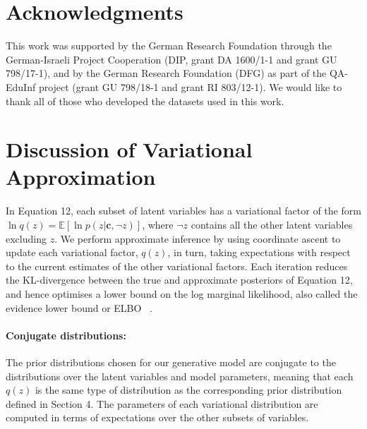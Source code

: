 \documentclass[11pt,a4paper]{article}
\newcommand{\bs}{\boldsymbol}
\begin{document}
\section*{Acknowledgments}

This work was supported by the German Research Foundation through the German-Israeli Project Cooperation (DIP, grant DA 1600/1-1 and grant GU 798/17-1), and 
by the German Research Foundation (DFG) as part of the QA-EduInf project (grant GU 798/18-1 and grant RI 803/12-1). 
We would like to thank all of those who developed the datasets used
in this work.

%
% 



\appendix
\section{Discussion of Variational Approximation}

In Equation 12,
each subset of latent variables has a variational factor of the form 
$\ln q(z) = \mathbb{E}[\ln p(z | \bs c, \neg z)]$, 
where $\neg z$ contains all the other latent variables excluding $z$.
We perform approximate inference by
using coordinate ascent to update each variational factor, $q(z)$, in turn,
taking expectations with respect to the current estimates of the other variational factors.
Each iteration reduces the KL-divergence between the true and approximate posteriors
of Equation 12, and hence optimises a lower bound on the 
log marginal likelihood, also called the evidence lower bound or ELBO
~\cite{Bishop2006,attias_advances_2000}.

\paragraph{Conjugate distributions: }The prior distributions chosen for our generative model are conjugate to the distributions over the
latent variables and model parameters, 
meaning that each $q(z)$ is the same type of distribution
as the corresponding  prior distribution defined in Section 4.
The parameters of each variational distribution are computed in terms  of 
expectations over the other subsets of variables.
\end{document}
